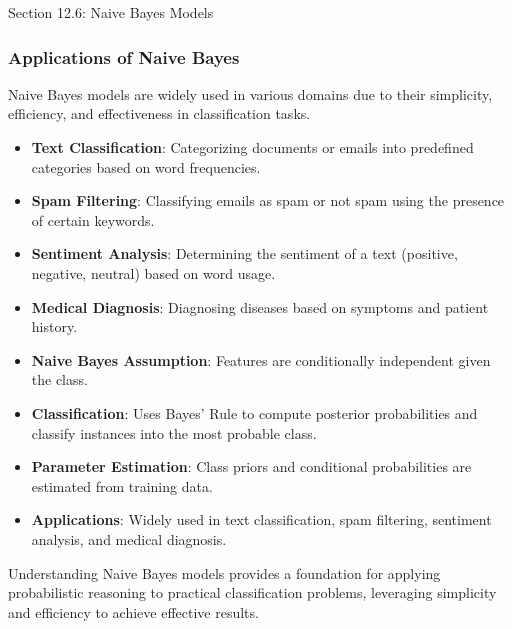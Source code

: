 \begin{notes}{Section 12.6: Naive Bayes Models}
\begin{highlight}
    \end{highlight}
    
    \subsubsection*{Applications of Naive Bayes}
    
    Naive Bayes models are widely used in various domains due to their simplicity, efficiency, and effectiveness in classification tasks.
    
    \begin{highlight}
    
        \begin{itemize}
            \item \textbf{Text Classification}: Categorizing documents or emails into predefined categories based on word frequencies.
            \item \textbf{Spam Filtering}: Classifying emails as spam or not spam using the presence of certain keywords.
            \item \textbf{Sentiment Analysis}: Determining the sentiment of a text (positive, negative, neutral) based on word usage.
            \item \textbf{Medical Diagnosis}: Diagnosing diseases based on symptoms and patient history.
        \end{itemize}
    
    \end{highlight}
    
    \begin{highlight}
    
        \begin{itemize}
            \item \textbf{Naive Bayes Assumption}: Features are conditionally independent given the class.
            \item \textbf{Classification}: Uses Bayes' Rule to compute posterior probabilities and classify instances into the most probable class.
            \item \textbf{Parameter Estimation}: Class priors and conditional probabilities are estimated from training data.
            \item \textbf{Applications}: Widely used in text classification, spam filtering, sentiment analysis, and medical diagnosis.
        \end{itemize}
    
        Understanding Naive Bayes models provides a foundation for applying probabilistic reasoning to practical classification problems, leveraging simplicity and efficiency to achieve effective results.
    
    \end{highlight}
\end{notes}

